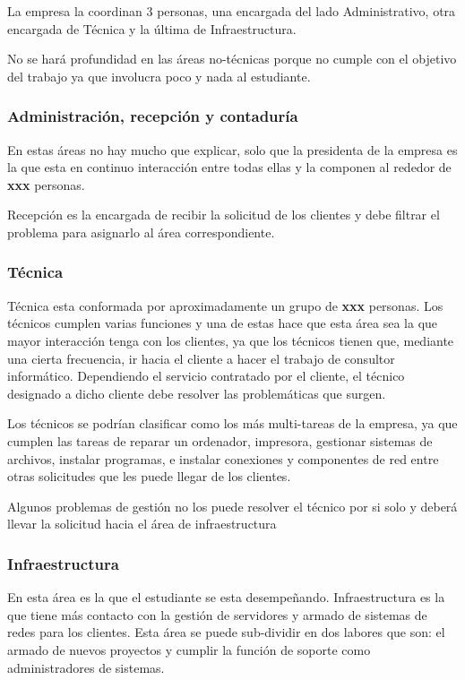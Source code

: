 \documentclass[12pt,a4paper]{article}
\begin{document}
La empresa la coordinan 3 personas, una encargada del lado Administrativo, otra encargada de Técnica y la última de Infraestructura.

No se hará profundidad en las áreas no-técnicas porque no cumple con el objetivo del trabajo ya que involucra poco y nada al estudiante.

\subsubsection{Administración, recepción y contaduría}
En estas áreas no hay mucho que explicar, solo que la presidenta de la empresa es la que esta en continuo interacción entre todas ellas y la componen al rededor de \textbf{xxx} personas.

Recepción es la encargada de recibir la solicitud de los clientes y debe filtrar el problema para asignarlo al área correspondiente. 

\subsubsection{Técnica}
Técnica esta conformada por aproximadamente un grupo de \textbf{xxx} personas. Los técnicos cumplen varias funciones y una de estas hace que esta área sea la que mayor interacción tenga con los clientes, ya que los técnicos tienen que, mediante una cierta frecuencia, ir hacia el cliente a hacer el trabajo de consultor informático. Dependiendo el servicio contratado por el cliente, el técnico designado a dicho cliente debe resolver las problemáticas que surgen.

Los técnicos se podrían clasificar como los más multi-tareas de la empresa, ya que cumplen las tareas de reparar un ordenador, impresora, gestionar sistemas de archivos, instalar programas, e instalar conexiones y componentes de red entre otras solicitudes que les puede llegar de los clientes.

Algunos problemas de gestión no los puede resolver el técnico por si solo y deberá llevar la solicitud hacia el área de infraestructura

\subsubsection{Infraestructura}
En esta área es la que el estudiante se esta desempeñando. Infraestructura es la que tiene más contacto con la gestión de servidores y armado de sistemas de redes para los clientes. Esta área se puede sub-dividir en dos labores que son: el armado de nuevos proyectos y cumplir la función de soporte como administradores de sistemas. 
\end{document}
